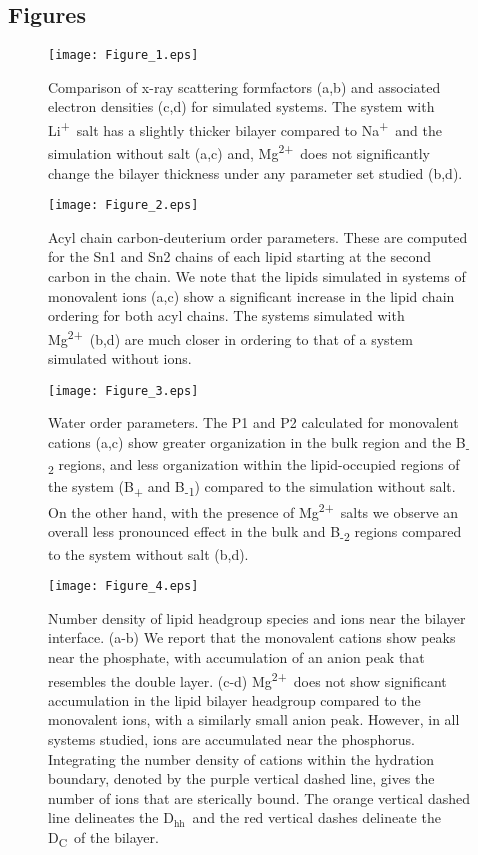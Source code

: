 \documentclass[journal=langd5,manuscript=article]{achemso}
\newcommand{\na}{Na\textsuperscript{+}~}
\newcommand{\li}{Li\textsuperscript{+}~}
\newcommand{\mg}{Mg\textsuperscript{2+}~}
\newcommand{\dhh}{$\text{D}_\text{hh}$}
\begin{document}
\subsection{Figures}
\begin{figure}
    \caption{Comparison of x-ray scattering formfactors (a,b) and associated electron densities (c,d) for simulated systems. 
    {The system with \li salt has a slightly thicker bilayer compared to \na and the simulation without salt (a,c) and},
    \mg does not significantly change the bilayer thickness
    under any parameter set studied (b,d). }
    \label{fig:eledens}
    \texttt{[image: Figure\_1.eps]}
\end{figure}
\clearpage
\begin{figure}
    \caption{Acyl chain carbon-deuterium order parameters. These are computed for the Sn1 and Sn2 chains of each lipid starting at the 
        second carbon in the chain\cite{egberts:1988,Douliez:1995}. We note that the lipids simulated in systems of monovalent ions (a,c) show a significant increase
in the lipid chain ordering for both acyl chains. The systems simulated with \mg (b,d) are much closer in ordering to that of a system
simulated without ions.}
    \label{fig:op}
    \texttt{[image: Figure\_2.eps]}
\end{figure}
\clearpage
\begin{figure}
    \caption{Water order parameters.   
        {The P1 and P2 calculated for monovalent cations (a,c) show greater 
            organization in the bulk region and the B\textsubscript{-2} regions, and less organization within 
            the lipid-occupied regions of the system (B\textsubscript{+} and B\textsubscript{-1}) compared to the simulation without salt. 
        } 
{On the other hand, with the presence of \mg salts we observe an overall less pronounced effect in the
bulk and B\textsubscript{-2} regions compared to the system without salt (b,d).}
}
    
    \label{fig:h2order}
    \texttt{[image: Figure\_3.eps]}
\end{figure}
\clearpage
\begin{figure}
    \caption{Number density of lipid headgroup species and
    ions near the bilayer interface. (a-b) We report that the 
    monovalent cations show peaks near the phosphate, with
    accumulation of an anion peak that resembles the double layer.
    (c-d) \mg does not show significant accumulation in the 
    lipid bilayer headgroup compared to the monovalent ions,
    with a similarly small anion peak. However, in all systems
    studied, ions are accumulated near the phosphorus.
    Integrating the number density of cations within the hydration boundary,
    denoted by the purple vertical dashed line, gives the number of ions that are
    sterically bound. The orange vertical dashed line delineates the \dhh~and the 
    red vertical dashes
delineate the D\textsubscript{C}~of the bilayer.}
    \label{fig:dens}
    \texttt{[image: Figure\_4.eps]}
\end{figure}
\end{document}
